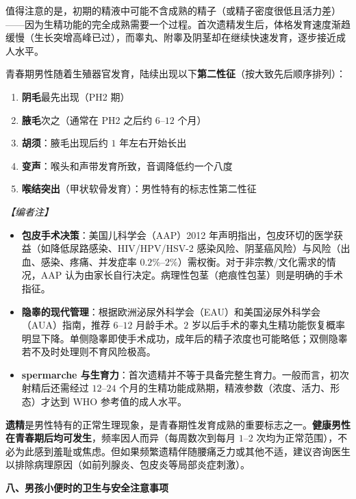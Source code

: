 值得注意的是，初期的精液中可能不含成熟的精子（或精子密度很低且活力差）——因为生精功能的完全成熟需要一个过程。首次遗精发生后，体格发育速度渐趋缓慢（生长突增高峰已过），而睾丸、附睾及阴茎却在继续快速发育，逐步接近成人水平。

青春期男性随着生殖器官发育，陆续出现以下\textbf{第二性征}（按大致先后顺序排列）：
\begin{enumerate}
	\item \textbf{阴毛}最先出现（PH2 期）
	\item \textbf{腋毛}次之（通常在 PH2 之后约 $6$--$12$ 个月）
	\item \textbf{胡须}：腋毛出现后约 $1$ 年左右开始长出
	\item \textbf{变声}：喉头和声带发育所致，音调降低约一个八度
	\item \textbf{喉结突出}（甲状软骨发育）：男性特有的标志性第二性征
\end{enumerate}

\vspace{0.5em}
\noindent\textit{【编者注】}
\begin{itemize}
	\item \textbf{包皮手术决策}：美国儿科学会（AAP）2012 年声明指出，包皮环切的医学获益（如降低尿路感染、HIV/HPV/HSV-2 感染风险、阴茎癌风险）与风险（出血、感染、疼痛、并发症率 $0.2\%$--$2\%$）需权衡。对于非宗教/文化需求的情况，AAP 认为由家长自行决定。病理性包茎（疤痕性包茎）则是明确的手术指征。
	\item \textbf{隐睾的现代管理}：根据欧洲泌尿外科学会（EAU）和美国泌尿外科学会（AUA）指南，推荐 $6$--$12$ 月龄手术。$2$ 岁以后手术的睾丸生精功能恢复概率明显下降。单侧隐睾即使手术成功，成年后的精子浓度也可能略低；双侧隐睾若不及时处理则不育风险极高。
	\item \textbf{spermarche 与生育力}：首次遗精并不等于具备完整生育力。一般而言，初次射精后还需经过 $12$--$24$ 个月的生精功能成熟期，精液参数（浓度、活力、形态）才达到 WHO 参考值的成人水平。
\end{itemize}

\begin{tcolorbox}[colback=pink!5!white,colframe=red!50!black,title=贴心小叮咛]
\textbf{遗精}是男性特有的正常生理现象，是青春期性发育成熟的重要标志之一。\textbf{健康男性在青春期后均可发生}，频率因人而异（每周数次到每月 $1$--$2$ 次均为正常范围），不必为此感到羞耻或焦虑。但如果频繁遗精伴随腰痛乏力或其他不适，建议咨询医生以排除病理原因（如前列腺炎、包皮炎等局部炎症刺激）。
\end{tcolorbox}

\vspace{0.8em}
\noindent\textbf{八、男孩小便时的卫生与安全注意事项}

